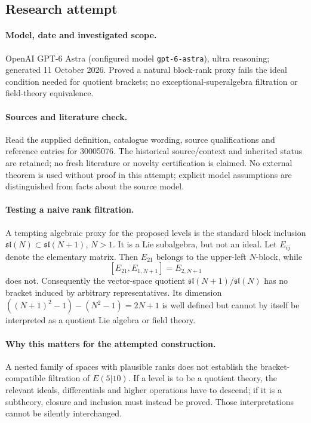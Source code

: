\documentclass[11pt]{article}
\begin{document}
\subsection{Research attempt}
\paragraph{Model, date and investigated scope.}
OpenAI GPT-6 Astra (configured model \texttt{gpt-6-astra}), ultra reasoning; generated 11 October 2026. Proved a natural block-rank proxy fails the ideal condition needed for quotient brackets; no exceptional-superalgebra filtration or field-theory equivalence.

\paragraph{Sources and literature check.}
Read the supplied definition, catalogue wording, source qualifications and reference entries for 30005076. The historical source/context and inherited status are retained; no fresh literature or novelty certification is claimed. No external theorem is used without proof in this attempt; explicit model assumptions are distinguished from facts about the source model.

\paragraph{Testing a naive rank filtration.} A tempting algebraic proxy for the proposed levels is the standard block inclusion \(\mathfrak{sl}(N)\subset\mathfrak{sl}(N+1)\), \(N>1\). It is a Lie subalgebra, but not an ideal. Let \(E_{ij}\) denote the elementary matrix. Then \(E_{21}\) belongs to the upper-left \(N\)-block, while
\[
 [E_{21},E_{1,N+1}]=E_{2,N+1}
\]
does not. Consequently the vector-space quotient \(\mathfrak{sl}(N+1)/\mathfrak{sl}(N)\) has no bracket induced by arbitrary representatives. Its dimension \(((N+1)^2-1)-(N^2-1)=2N+1\) is well defined but cannot by itself be interpreted as a quotient Lie algebra or field theory.
\paragraph{Why this matters for the attempted construction.} A nested family of spaces with plausible ranks does not establish the bracket-compatible filtration of \(E(5|10)\). If a level is to be a quotient theory, the relevant ideals, differentials and higher operations have to descend; if it is a subtheory, closure and inclusion must instead be proved. Those interpretations cannot be silently interchanged.
\end{document}
